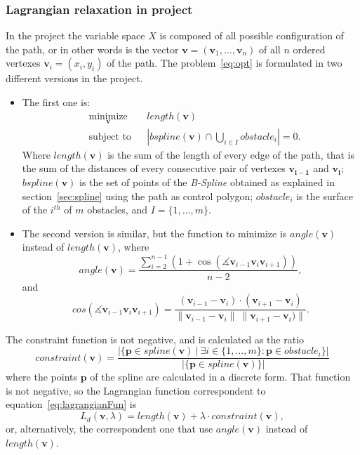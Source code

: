 \documentclass[a4paper]{article}
\begin{document}
\subsubsection{Lagrangian relaxation in project}
In the project the variable space $X$ is composed of all possible
configuration of the path, or in other words is the vector
$\mathbf{v}=(\mathbf{v}_1,\dots,\mathbf{v}_n)$ of all $n$ ordered
vertexes $\mathbf{v}_i=(x_i,y_i)$ of the
path. The problem~\eqref{eq:opt} is formulated in two different
versions in the project.
\begin{itemize}
\item The first one is:
  \begin{equation*}
    \begin{aligned}
      & \underset{\mathbf{v}}{\text{minimize}}
      & & length(\mathbf{v}) \\
      & \text{subject to}
      & & \left|bspline(\mathbf{v})\cap \bigcup_{i\in I}obstacle_i\right| = 0.
    \end{aligned}
  \end{equation*}
  Where $length(\mathbf{v})$ is the sum of the length of every edge of the
  path, that is the sum of the distances of every consecutive pair of
  vertexes $\mathbf{v_{i-1}}$ and $\mathbf{v_i}$; $bspline(\mathbf{v})$
  is the set of points of the \emph{B-Spline} obtained as explained in
  section~\ref{sec:spline} using the path as control polygon;
  $obstacle_i$ is the surface of the $i^{th}$ of $m$ obstacles, and
  $I=\{1,\dots,m\}$.
\item The second version is similar, but the function to minimize is
  $angle(\mathbf{v})$ instead of $length(\mathbf{v})$, where
  \begin{equation*}
    angle(\mathbf{v}) = \frac{\sum_{i=2}^{n-1}(1+\cos(\measuredangle \mathbf{v}_{i-1}\mathbf{v}_{i}\mathbf{v}_{i+1}))}{n-2},
  \end{equation*}
  and
  \begin{equation*}
    cos(\measuredangle
    \mathbf{v}_{i-1}\mathbf{v}_{i}\mathbf{v}_{i+1})=\frac{(\mathbf{v}_{i-1}-\mathbf{v}_{i})\cdot
      (\mathbf{v}_{i+1}-\mathbf{v}_{i})}{\|\mathbf{v}_{i-1}-\mathbf{v}_{i}\|\
      \|\mathbf{v}_{i+1}-\mathbf{v}_{i})\|}.
  \end{equation*}
\end{itemize}

The constraint function is not negative, and is calculated as the
ratio
\begin{equation*}
constraint(\mathbf{v}) = \frac{|\{\mathbf{p} \in spline(\mathbf{v})\ |\ \exists i\in\{1,\dots,m\}
  : \mathbf{p}\in obstacle_i \}|}{|\{\mathbf{p} \in spline(\mathbf{v})\}|}
\end{equation*}
where the points $\mathbf{p}$ of the spline are calculated in a discrete form. That
function is not negative, so the Lagrangian function correspondent to
equation~\eqref{eq:lagrangianFun} is
\begin{equation}\label{eq:lagrangianFunProj}
    L_d(\mathbf{v},\lambda)=length(\mathbf{v})+\lambda\cdot constraint(\mathbf{v}),
\end{equation}
or, alternatively, the correspondent one that use $angle(\mathbf{v})$ instead of $length(\mathbf{v})$.
\end{document}
